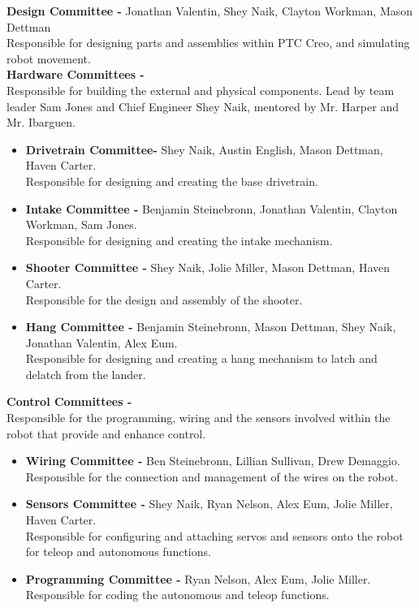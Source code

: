 \insertCommittees
{}
\noindent\textbf{\Large Design Committee -} Jonathan Valentin, Shey Naik, Clayton Workman, Mason Dettman \\ Responsible for designing parts and assemblies within PTC Creo, and simulating robot movement. \\
\newline\noindent\textbf{\Large Hardware Committees -}
\\ Responsible for building the external and physical components. Lead by team leader Sam Jones and Chief Engineer Shey Naik, mentored by Mr. Harper and Mr. Ibarguen.\\

\begin{itemize}

\item \textbf{Drivetrain Committee-} Shey Naik, Austin English, Mason Dettman, Haven Carter. \\ Responsible for designing and creating the base drivetrain.

\item \textbf{Intake Committee -} Benjamin Steinebronn, Jonathan Valentin, Clayton Workman, Sam Jones.  \\ Responsible for designing and creating the intake mechanism. 

\item \textbf{Shooter Committee -} Shey Naik, Jolie Miller, Mason Dettman, Haven Carter. \\Responsible for the design and assembly of the shooter. 

\item \textbf{Hang Committee -} Benjamin Steinebronn, Mason Dettman, Shey Naik, Jonathan Valentin, Alex Eum. \\  Responsible for designing and creating a hang mechanism to latch and delatch from the lander. 

\end{itemize} 

\noindent\textbf{\Large Control Committees -} \\ Responsible for the programming, wiring and the sensors involved within the robot that provide and enhance control. 

\begin{itemize}

\item \textbf{Wiring Committee -} Ben Steinebronn, Lillian Sullivan, Drew Demaggio. \\ 
Responsible for the connection and management of the wires on the robot. 

\item \textbf{Sensors Committee -} Shey Naik, Ryan Nelson, Alex Eum, Jolie Miller, Haven Carter. \\
Responsible for configuring and attaching servos and sensors onto the robot for teleop and autonomous functions. 

\item \textbf{Programming Committee -} Ryan Nelson, Alex Eum, Jolie Miller. \\ Responsible for coding the autonomous and teleop functions. 

\end{itemize} 

